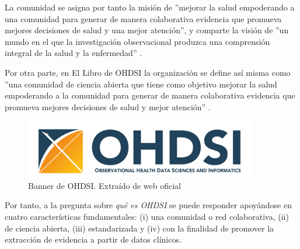 La comunidad se asigna por tanto la misión de ''mejorar la salud empoderando a una comunidad para generar de manera colaborativa evidencia que promueva mejores decisiones de salud y una mejor atención'', y comparte la visión de ''un mundo en el que la investigación observacional produzca una comprensión integral de la salud y la enfermedad'' \cite{OHDSIwebsite}\cite{OHDSIbook}. 

Por otra parte, en El Libro de OHDSI la organización se define así misma como ''una comunidad de ciencia abierta que tiene como objetivo mejorar la salud empoderando a la comunidad para generar de manera colaborativa evidencia que promueva mejores decisiones de salud y mejor atención'' \cite{OHDSIbook}. %

\begin{figure}[H]
    \centering
    \includegraphics[width=0.90\textwidth]{figures/OHDSIbanner.png}
    \caption{Banner de OHDSI. Extraído de web oficial \cite{OHDSIwebsite}}
    \label{fig:OHDSIbanner}
\end{figure}

Por tanto, a la pregunta sobre \textit{qué es OHDSI} se puede responder apoyándose en cuatro características fundamentales: (i)  una comunidad o red colaborativa, (ii) de ciencia abierta, (iii) estandarizada y (iv) con la finalidad de promover la extracción de evidencia a partir de datos clínicos.


